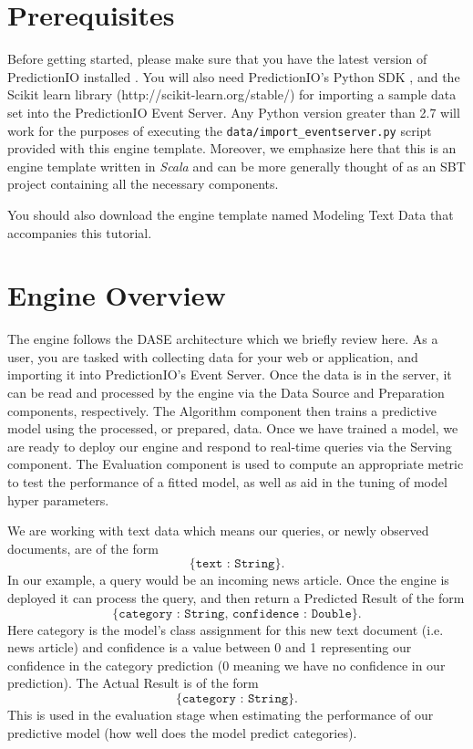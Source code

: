 \documentclass[a4paper,12pt]{article}
\renewcommand{\it}[1]{\textit{#1}}
\renewcommand{\tt}[1]{\texttt{#1}}
\newcommand{\3}{\left}
\newcommand{\4}{\right}
\renewcommand{\-}[1]{{}^{-#1}}
\begin{document}
\section*{Prerequisites}

Before getting started, please make sure that you have the latest version of PredictionIO installed 
. You will also need PredictionIO's Python SDK 
, and the Scikit learn library (http://scikit-learn.org/stable/) for importing a sample data set into the PredictionIO Event Server. Any Python version greater than 2.7 will work for the purposes of executing the \tt{data/import\_eventserver.py} script provided with this engine template. Moreover, we emphasize here that this is an engine template written in \it{Scala} and can be more generally thought of as an SBT project containing all the necessary components.

You should also download the engine template named Modeling Text Data 
 that accompanies this tutorial.

\section*{Engine Overview}

The engine follows the DASE architecture which we briefly review here. As a user, you are tasked with collecting data for your web or application, and importing it into PredictionIO's Event Server. Once the data is in the server, it  can be read and processed by the engine via the Data Source and Preparation components, respectively. The Algorithm component then trains a predictive model using the processed, or prepared, data. Once we have trained a model, we are ready to deploy our engine and respond to real-time queries via the Serving component. The Evaluation component is used to compute an appropriate metric to test the performance of a fitted model, as well as aid in the tuning of model hyper parameters. 

We are working with text data which means our queries, or newly observed documents, are of the form 
$$
\tt{\{text : String\}}.$$
In our example, a query would be an incoming news article. Once the engine is deployed it can process the query, and then return a Predicted Result of the form 
$$
\tt{\{category : String, confidence : Double\}}.
$$
Here category is the model's class assignment for this new text document (i.e. news article) and confidence is a value between 0 and 1 representing our confidence in the category prediction (0 meaning we have no confidence in our prediction). The Actual Result is of the form 
$$
\tt{\{category : String\}}.
$$
This is used in the evaluation stage when estimating the performance of our predictive model (how well does the model predict categories). 
 
\end{document}
